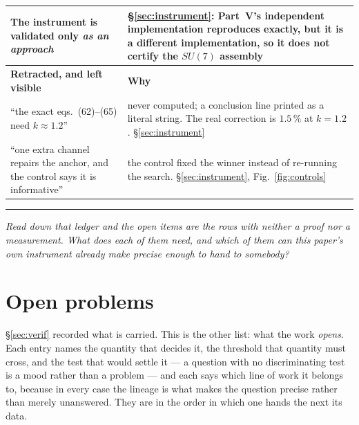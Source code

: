\documentclass[11pt,a4paper]{article}
\newcommand{\su}[1]{SU(#1)}
\newcommand{\bridge}[1]{\par\medskip\noindent
  \textcolor{hdrblue!45}{\rule{2.2cm}{0.6pt}}\;\;\parbox[t]{0.84\textwidth}{\small\itshape
  \textcolor{hdrblue!85}{#1}}\par\medskip}
\begin{document}
\begin{longtable}{p{}p{}}
The instrument is validated only \emph{as an approach} & \S\ref{sec:instrument}: Part~V's
independent implementation reproduces \cite{AHMN} exactly, but it is a different implementation, so
it does not certify the $\su7$ assembly\\
\midrule
\rowcolor{warmred!14}\textbf{Retracted, and left visible} & \textbf{Why}\\
\midrule
``the exact eqs.~(62)--(65) need $k\approx1.2$'' & never computed; a conclusion line printed as a
literal string. The real correction is $1.5\,\%$ at $k=1.2$. \S\ref{sec:instrument}\\
``one extra channel repairs the anchor, and the control says it is informative'' & the control fixed
the winner instead of re-running the search. \S\ref{sec:instrument}, Fig.~\ref{fig:controls}\\
\bottomrule
\end{longtable}
\endgroup

\bridge{Read down that ledger and the open items are the rows with neither a proof nor a
measurement. What does each of them need, and which of them can this paper's own instrument
already make precise enough to hand to somebody?}

\section{Open problems}\label{sec:open}

\S\ref{sec:verif} recorded what is carried. This is the other list: what the work \emph{opens}.
Each entry names the quantity that decides it, the threshold that quantity must cross, and the test
that would settle it --- a question with no discriminating test is a mood rather than a problem ---
and each says which line of work it belongs to, because in every case the lineage is what makes the
question precise rather than merely unanswered. They are in the order in which one hands the next
its data.
\end{document}

